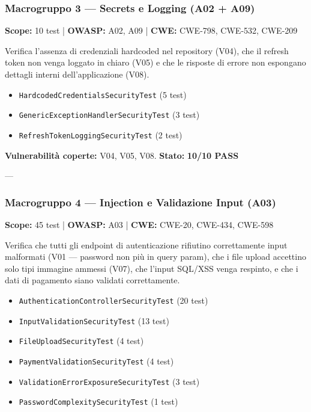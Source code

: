 \documentclass[12pt, a4paper]{article}
\begin{document}
    \subsubsection{Macrogruppo 3 — Secrets e Logging (A02 + A09)}
    \label{subsubsec:group3_secrets}

    \textbf{Scope:} 10 test | \textbf{OWASP:} A02, A09 | \textbf{CWE:} CWE-798, CWE-532, CWE-209

    Verifica l'assenza di credenziali hardcoded nel repository (V04), che il
    refresh token non venga loggato in chiaro (V05) e che le risposte di errore
    non espongano dettagli interni dell'applicazione (V08).

    \begin{itemize}
        \item \texttt{HardcodedCredentialsSecurityTest} (5 test)
        \item \texttt{GenericExceptionHandlerSecurityTest} (3 test)
        \item \texttt{RefreshTokenLoggingSecurityTest} (2 test)
    \end{itemize}

    \textbf{Vulnerabilità coperte:} V04, V05, V08. \quad
    \textbf{Stato:} \checkmark{} \textbf{10/10 PASS}

    ---

    \subsubsection{Macrogruppo 4 — Injection e Validazione Input (A03)}
    \label{subsubsec:group4_injection}

    \textbf{Scope:} 45 test | \textbf{OWASP:} A03 | \textbf{CWE:} CWE-20, CWE-434, CWE-598

    Verifica che tutti gli endpoint di autenticazione rifiutino correttamente input
    malformati (V01 — password non più in query param), che i file upload accettino
    solo tipi immagine ammessi (V07), che l'input SQL/XSS venga respinto, e che i
    dati di pagamento siano validati correttamente.

    \begin{itemize}
        \item \texttt{AuthenticationControllerSecurityTest} (20 test)
        \item \texttt{InputValidationSecurityTest} (13 test)
        \item \texttt{FileUploadSecurityTest} (4 test)
        \item \texttt{PaymentValidationSecurityTest} (4 test)
        \item \texttt{ValidationErrorExposureSecurityTest} (3 test)
        \item \texttt{PasswordComplexitySecurityTest} (1 test)
    \end{itemize}
\end{document}
